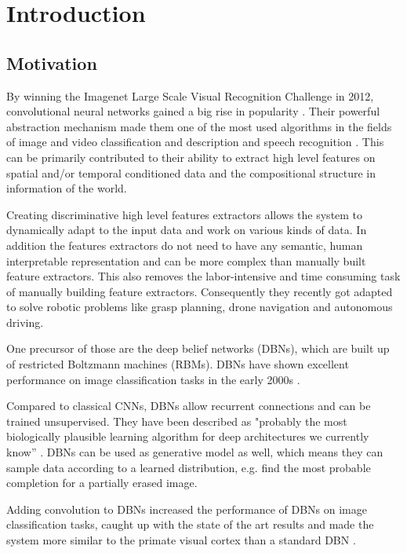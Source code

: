 \chapter{Introduction}

\section{Motivation} \label{c:motiv}

By winning the Imagenet Large Scale Visual Recognition Challenge in 2012, convolutional neural networks gained a big rise in popularity \cite{NIPS2012_4824}. 
Their powerful abstraction mechanism made them one of the most used algorithms in the fields of image and video classification and description and speech recognition \cite{szegedy2015going}\cite{karpathy2014large}\cite{abdel2014convolutional}\cite{LeCun2015}. 
This can be primarily contributed to their ability to extract high level features on spatial and/or temporal conditioned data and the compositional structure in information of the world.

Creating discriminative high level features extractors allows the system to dynamically adapt to the input data and work on various kinds of data. 
In addition the features extractors do not need to have any semantic, human interpretable representation and can be more complex than manually built feature extractors. 
This also removes the labor-intensive and time consuming task of manually building feature extractors.
Consequently they recently got adapted to solve robotic problems like grasp planning, drone navigation and autonomous driving\cite{giusti2016machine}\cite{levine2016learning}\cite{chen2015deepdriving}. 

One precursor of those are the deep belief networks (DBNs), which are built up of restricted Boltzmann machines (RBMs). 
DBNs have shown excellent performance on image classification tasks in the early 2000s \cite{hinton2006fast}\cite{lee2009convolutional}.

Compared to classical CNNs, DBNs allow recurrent connections and can be trained unsupervised. 
They have been described as  "probably the most biologically plausible learning algorithm for deep architectures we currently know” \cite{bengio2015towards}. 
DBNs can be used as generative model as well, which means they can sample data according to a learned distribution, e.g. find the most probable completion for a partially erased image.

Adding convolution to DBNs increased the performance of DBNs on image classification tasks, caught up with the state of the art results and made the system more similar to the primate visual cortex than a standard DBN \cite{lee2009convolutional}. 

